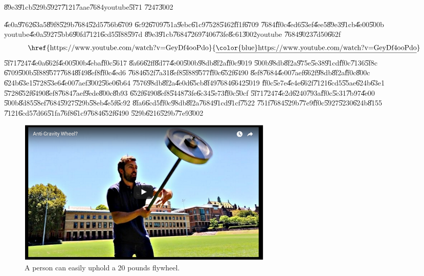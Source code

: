 \begin{case}
\U{89e3}\U{91cb}\U{529b}\U{5927}\U{7121}\U{7aae}\U{7684}youtube\U{5f71}%
\U{7247}\U{3002}
\end{case}

\bigskip

\U{4e0a}\U{9762}\U{63a5}\U{89f8}\U{529b}\U{7684}\U{52d5}\U{756b}\U{6709}%
\U{6c92}\U{6709}\U{751a}\U{9ebc}\U{61c9}\U{7528}\U{5462}\U{ff1f}\U{6709}%
\U{7684}\U{ff0c}\U{4ed6}\U{53ef}\U{4ee5}\U{89e3}\U{91cb}\U{4e00}\U{500b}%
youtube\U{4e0a}\U{5927}\U{5bb6}\U{90fd}\U{7121}\U{6cd5}\U{5f88}\U{597d}%
\U{89e3}\U{91cb}\U{7684}\U{7269}\U{7406}\U{73fe}\U{8c61}\U{3002}youtube%
\U{7684}\U{9023}\U{7d50}\U{662f}%
\begin{equation*}
\text{\href{https://www.youtube.com/watch?v=GeyDf4ooPdo}{\underline{%
\color{blue}\smash{https://www.youtube.com/watch?v=GeyDf4ooPdo}}}}
\end{equation*}%
\U{5f71}\U{7247}\U{4e0a}\U{662f}\U{4e00}\U{500b}\U{4eba}\U{ff0c}\U{5617}%
\U{8a66}\U{62ff}\U{8d77}\U{4e00}\U{500b}\U{98db}\U{8f2a}\U{ff0c}\U{9019}%
\U{500b}\U{98db}\U{8f2a}\U{975e}\U{5e38}\U{91cd}\U{ff0c}\U{7136}\U{5f8c}%
\U{6709}\U{500b}\U{5f88}\U{9577}\U{7684}\U{8f49}\U{8ef8}\U{ff0c}\U{4ed6}%
\U{7684}\U{652f}\U{7a31}\U{8ef8}\U{5f88}\U{9577}\U{ff0c}\U{652f}\U{6490}%
\U{8ef8}\U{7684}\U{4e00}\U{7aef}\U{662f}\U{98db}\U{8f2a}\U{ff0c}\U{800c}%
\U{624b}\U{63e1}\U{5728}\U{53e6}\U{4e00}\U{7aef}\U{3002}\U{56e0}\U{6b64}%
\U{7576}\U{98db}\U{8f2a}\U{4e0d}\U{65cb}\U{8f49}\U{7684}\U{6642}\U{5019}%
\U{ff0c}\U{5e7e}\U{4e4e}\U{662f}\U{7121}\U{6cd5}\U{55ae}\U{624b}\U{63e1}%
\U{5728}\U{652f}\U{6490}\U{8ef8}\U{7684}\U{7aef}\U{9ede}\U{800c}\U{8b93}%
\U{652f}\U{6490}\U{8ef8}\U{5448}\U{73fe}\U{6c34}\U{5e73}\U{ff0c}\U{50cf}%
\U{5f71}\U{7247}\U{4e2d}\U{6240}\U{793a}\U{ff0c}\U{5c31}\U{7b97}\U{4e00}%
\U{500b}\U{8d85}\U{58ef}\U{7684}\U{5927}\U{529b}\U{58eb}\U{4e5f}\U{6c92}%
\U{8fa6}\U{6cd5}\U{ff0c}\U{98db}\U{8f2a}\U{7684}\U{91cd}\U{91cf}\U{7522}%
\U{751f}\U{7684}\U{529b}\U{77e9}\U{ff0c}\U{5927}\U{5230}\U{624b}\U{8155}%
\U{7121}\U{6cd5}\U{7d66}\U{51fa}\U{76f8}\U{61c9}\U{7684}\U{652f}\U{6490}%
\U{529b}\U{6216}\U{529b}\U{77e9}\U{3002}

\begin{figure}[th]
\caption{A person can easily uphold a 20 pounds flywheel.}
\begin{center}
\includegraphics[width=0.6\textwidth]{./figs/hercules.png}
\end{center}
\end{figure}

